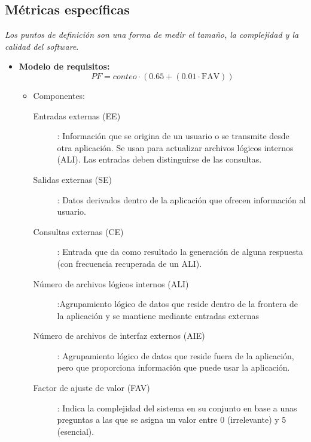     \subsection{Métricas específicas}\label{subsec:metricas-especificas}

    \begin{definicion}

        \textit{Los puntos de definición son una forma de medir el tamaño, la complejidad y la calidad del software}.

    \end{definicion}
    \begin{itemize}
        \item \textbf{Modelo de requisitos:}
        \[PF = conteo \cdot (0.65 + (0.01 \cdot \text{FAV}))\]
        \begin{itemize}
            \item Componentes:
            \begin{description}
                \item[Entradas externas (EE)]: Información que se origina de un usuario o se transmite desde otra aplicación.
                Se usan para actualizar archivos lógicos internos (ALI). Las entradas deben distinguirse de las consultas.
                \item[Salidas externas (SE)]: Datos derivados dentro de la aplicación que ofrecen información al usuario.
                \item [Consultas externas (CE)]: Entrada que da como resultado la generación de alguna respuesta (con frecuencia recuperada de un ALI).
                \item[Número de archivos lógicos internos (ALI)]:Agrupamiento lógico de datos que reside dentro de la frontera de la aplicación y se mantiene mediante entradas externas
                \item[Número de archivos de interfaz externos (AIE)]:
                Agrupamiento lógico de datos que reside fuera de la aplicación, pero que proporciona información que puede usar la aplicación.
                \item [Factor de ajuste de valor (FAV)]: Indica la complejidad del sistema en su conjunto en base a unas preguntas a las que se asigna un valor entre 0 (irrelevante) y 5 (esencial).
            \end{description}
        \end{itemize}


\end{itemize}
